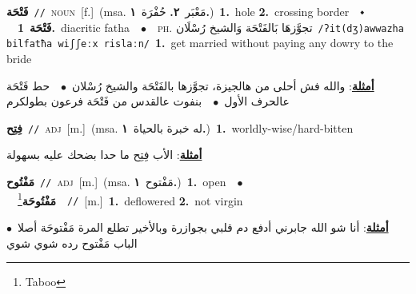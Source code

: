 \documentclass[10pt,a4paper,twoside]{article} %
\begin{document}
\begin{multicols}{2}
{\setlength\topsep{0pt}\textbf{\foreignlanguage{arabic}{فَتْحَة}}\ {\color{gray}\texttt{//}\color{black}}\ \textsc{noun}\ [f.]\ \color{gray}(msa. \foreignlanguage{arabic}{مَعْبَر}~\foreignlanguage{arabic}{\textbf{٢.}}  \foreignlanguage{arabic}{حُفْرَة}~\foreignlanguage{arabic}{\textbf{١.}})\color{black}\ \textbf{1.}~hole  \textbf{2.}~crossing border\ \ $\smblkdiamond$\ \ \setlength\topsep{0pt}\textbf{\foreignlanguage{arabic}{فَتْحَة}}\ \textbf{1.}~diacritic fatha\ \ $\bullet$\ \ \textsc{ph.} \color{gray} \foreignlanguage{arabic}{تجوَّزهَا بَالفَتْحَة وَالشيخ رُسْلَان}\color{black}\ {\color{gray}\texttt{/{\sffamily ʔit(dʒ)awwazha bilfatħa wiʃʃeːx rislaːn}/}\color{black}}\ \textbf{1.}~get married without paying any dowry to the bride\  \begin{flushright}\color{gray}\foreignlanguage{arabic}{\textbf{\underline{\foreignlanguage{arabic}{أمثلة}}}: والله فش أحلى من هالجيزة، تجوَّزها بالفَتْحَة والشيخ رُسْلان\ $\bullet$\ \  حط فَتْحَة عالحرف الأول\ $\bullet$\ \  بنفوت عالقدس من فَتْحَة فرعون بطولكرم}\end{flushright}\color{black}} \vspace{2mm}

{\setlength\topsep{0pt}\textbf{\foreignlanguage{arabic}{فِتِح}}\ {\color{gray}\texttt{//}\color{black}}\ \textsc{adj}\ [m.]\ \color{gray}(msa. \foreignlanguage{arabic}{له خبرة بالحياة}~\foreignlanguage{arabic}{\textbf{١.}})\color{black}\ \textbf{1.}~worldly-wise/hard-bitten\  \begin{flushright}\color{gray}\foreignlanguage{arabic}{\textbf{\underline{\foreignlanguage{arabic}{أمثلة}}}: الأب فِتِح ما حدا بضحك عليه بسهولة}\end{flushright}\color{black}} \vspace{2mm}

{\setlength\topsep{0pt}\textbf{\foreignlanguage{arabic}{مَفْتُوح}}\ {\color{gray}\texttt{//}\color{black}}\ \textsc{adj}\ [m.]\ \color{gray}(msa. \foreignlanguage{arabic}{مَفْتوح}~\foreignlanguage{arabic}{\textbf{١.}})\color{black}\ \textbf{1.}~open\ \ $\bullet$\ \ \setlength\topsep{0pt}\textbf{\foreignlanguage{arabic}{مَفْتُوحَة}}\footnote{Taboo}\ \ {\color{gray}\texttt{//}\color{black}}\ [m.]\ \textbf{1.}~deflowered  \textbf{2.}~not virgin\  \begin{flushright}\color{gray}\foreignlanguage{arabic}{\textbf{\underline{\foreignlanguage{arabic}{أمثلة}}}: أنا شو الله جابرني أدفع دم قلبي بجوازرة وبالأخير تطلع المرة مَفْتوحَة أصلا\ $\bullet$\ \  الباب مَفْتوح رده شوي شوي}\end{flushright}\color{black}} \vspace{2mm}


\end{multicols}
\end{document}
